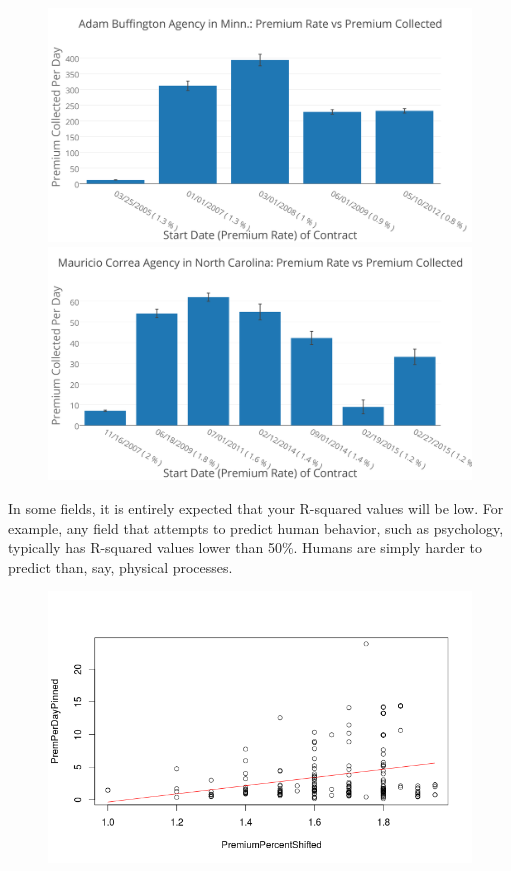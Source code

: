 \documentclass{article}
\begin{document}
\begin{figure}[H]
\centering
\includegraphics[width=0.34\paperwidth]{Adam_Buffington_Agency_in_Minn-_Premium_Rate_vs_Premium_Collected.png}
\includegraphics[width=0.34\paperwidth]{Mauricio_Correa_Agency_in_North_Carolina-_Premium_Rate_vs_Premium_Collected.png}
\end{figure}

In some fields, it is entirely expected that your R-squared values will be low. For example, any field that attempts to predict human behavior, such as psychology, typically has R-squared values lower than 50\%. Humans are simply harder to predict than, say, physical processes.


\begin{figure}[b]
\centering
\includegraphics[width=0.45\paperwidth]{pinnedPremPerDay.png}
\end{figure}
\end{document}
